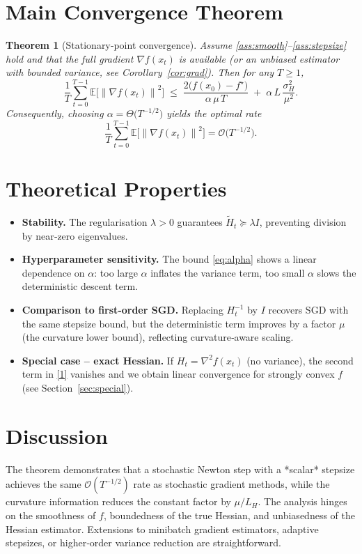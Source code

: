 \documentclass{article}
\newtheorem{theorem}{Theorem}
\newcommand{\E}{\mathbb{E}}
\newcommand{\norm}[1]{\left\lVert #1 \right\rVert}
\begin{document}
\section*{Main Convergence Theorem}
\begin{theorem}[Stationary‑point convergence]\label{thm:main}
Assume \ref{ass:smooth}–\ref{ass:stepsize} hold and that the full gradient $\nabla f(x_{t})$ is available (or an unbiased estimator with bounded variance, see Corollary~\ref{cor:grad}). Then for any $T\ge1$,
\[
\frac{1}{T}\sum_{t=0}^{T-1}\E\!\bigl[\norm{\nabla f(x_{t})}^{2}\bigr]
\;\le\;
\frac{2\bigl(f(x_{0})-f^{\star}\bigr)}{\alpha\,\mu\,T}
\;+\;
\alpha\,L\,\frac{\sigma_{H}^{2}}{\mu^{2}} .
\tag{1}
\]
Consequently, choosing $\alpha = \Theta\!\bigl(T^{-1/2}\bigr)$ yields the optimal rate
\[
\frac{1}{T}\sum_{t=0}^{T-1}\E\!\bigl[\norm{\nabla f(x_{t})}^{2}\bigr]=\mathcal{O}\!\bigl(T^{-1/2}\bigr).
\]
\end{theorem}

\section*{Theoretical Properties}
\begin{itemize}[leftmargin=*]
\item \textbf{Stability.} The regularisation $\lambda>0$ guarantees $\tilde H_{t}\succeq \lambda I$, preventing division by near‑zero eigenvalues.
\item \textbf{Hyperparameter sensitivity.} The bound \eqref{eq:alpha} shows a linear dependence on $\alpha$: too large $\alpha$ inflates the variance term, too small $\alpha$ slows the deterministic descent term.
\item \textbf{Comparison to first‑order SGD.} Replacing $H_{t}^{-1}$ by $I$ recovers SGD with the same stepsize bound, but the deterministic term improves by a factor $\mu$ (the curvature lower bound), reflecting curvature‑aware scaling.
\item \textbf{Special case – exact Hessian.} If $H_{t}=\nabla^{2}f(x_{t})$ (no variance), the second term in \eqref{1} vanishes and we obtain linear convergence for strongly convex $f$ (see Section~\ref{sec:special}).
\end{itemize}

\section*{Discussion}
The theorem demonstrates that a stochastic Newton step with a *scalar* stepsize achieves the same $\mathcal{O}(T^{-1/2})$ rate as stochastic gradient methods, while the curvature information reduces the constant factor by $\mu/L_{H}$. The analysis hinges on the smoothness of $f$, boundedness of the true Hessian, and unbiasedness of the Hessian estimator. Extensions to minibatch gradient estimators, adaptive stepsizes, or higher‑order variance reduction are straightforward.
\end{document}
